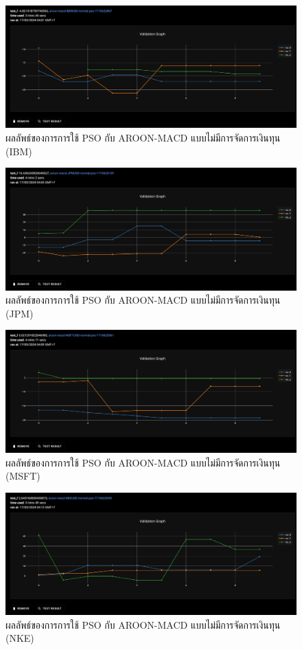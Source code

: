 \begin{figure}[ht]
    \centering
    \includegraphics[width=\textwidth]{images/pso/aroon-macd/ibm-normal.png}
    \caption{ผลลัพธ์ของการการใช้ PSO กับ AROON-MACD แบบไม่มีการจัดการเงินทุน (IBM)}
\end{figure}
\begin{figure}[ht]
    \centering
    \includegraphics[width=\textwidth]{images/pso/aroon-macd/jpm-normal.png}
    \caption{ผลลัพธ์ของการการใช้ PSO กับ AROON-MACD แบบไม่มีการจัดการเงินทุน (JPM)}
\end{figure}
\begin{figure}[ht]
    \centering
    \includegraphics[width=\textwidth]{images/pso/aroon-macd/msft-normal.png}
    \caption{ผลลัพธ์ของการการใช้ PSO กับ AROON-MACD แบบไม่มีการจัดการเงินทุน (MSFT)}
\end{figure}
\begin{figure}[ht]
    \centering
    \includegraphics[width=\textwidth]{images/pso/aroon-macd/nke-normal.png}
    \caption{ผลลัพธ์ของการการใช้ PSO กับ AROON-MACD แบบไม่มีการจัดการเงินทุน (NKE)}
\end{figure}

